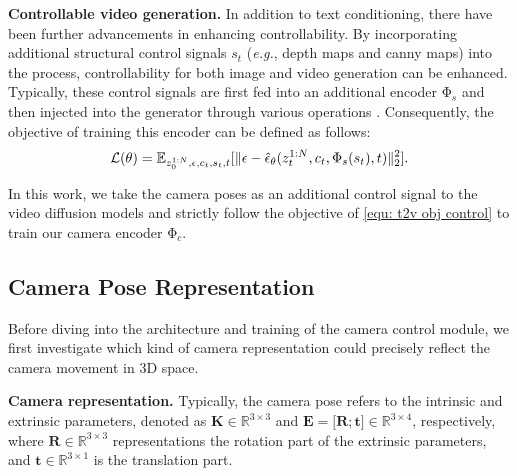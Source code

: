 \noindent \textbf{Controllable video generation.} 
In addition to text conditioning, there have been further advancements in enhancing controllability. By incorporating additional structural control signals $s_t$ (\emph{e.g.}, depth maps and canny maps) into the process, controllability for both image and video generation can be enhanced. 
%
Typically, these control signals are first fed into an additional encoder $\mathrm{\Phi}_s$ and then injected into the generator through various operations \citep{controlnet, t2iadaptor, ipadaptor}. 
%
Consequently, the objective of training this encoder can be defined as follows:
\begin{equation}
	{\mathcal{L}}(\theta) = \mathbb{E}_{z_{0}^{1:N}, \epsilon, c_t, s_t, t}[\|\epsilon - \hat{\epsilon}_{\theta}(z_{t}^{1:N}, c_t, \mathrm{\Phi}_s(s_t), t)\|^2_2].
	\label{equ: t2v obj control}
\end{equation}

In this work, we take the camera poses as an additional control signal to the video diffusion models and strictly follow the objective of \cref{equ: t2v obj control} to train our camera encoder $\mathrm{\Phi}_c$. 

\subsection{Camera Pose Representation} \label{subsec:cam_represent}
Before diving into the architecture and training of the camera control module, we first investigate which kind of camera representation could precisely reflect the camera movement in 3D space.

\noindent \textbf{Camera representation.} Typically, the camera pose refers to the intrinsic and extrinsic parameters, denoted as $\mathbf{K} \in \mathbb{R}^{3 \times 3}$ and $\mathbf{E}=\lbrack \mathbf{R}; \mathbf{t} \rbrack \in \mathbb{R}^{3 \times 4}$, respectively, where $\mathbf{R} \in \mathbb{R}^{3 \times 3}$ representations the rotation part of the extrinsic parameters, and $\mathbf{t} \in\mathbb{R}^{3 \times 1}$ is the translation part.

